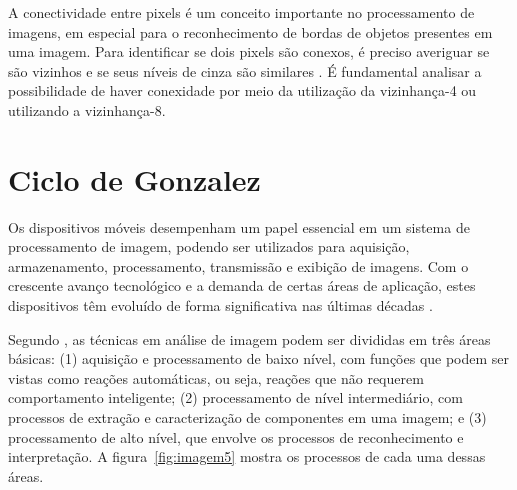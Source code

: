 A conectividade entre pixels é um conceito importante no processamento de imagens, em especial para o reconhecimento de bordas de objetos presentes em uma imagem. Para identificar se dois pixels são conexos, é preciso averiguar se são vizinhos e se seus níveis de cinza são similares . É fundamental analisar a possibilidade de haver conexidade por meio da utilização da vizinhança-4 ou utilizando a vizinhança-8.




\section{Ciclo de Gonzalez}
Os dispositivos móveis desempenham um papel essencial em um sistema de processamento de imagem, podendo ser utilizados para aquisição, armazenamento, processamento, transmissão e exibição de imagens. Com o crescente avanço tecnológico e a demanda de certas áreas de aplicação, estes dispositivos têm evoluído de forma significativa nas últimas décadas \cite{PEDRINI2008}.

Segundo , as técnicas em análise de imagem podem ser divididas em três áreas básicas: (1) aquisição e processamento de baixo nível, com funções que podem ser vistas como reações automáticas, ou seja, reações que não requerem comportamento inteligente; (2) processamento de nível intermediário, com processos de extração e caracterização de componentes em uma imagem; e (3) processamento de alto nível, que envolve os processos de reconhecimento e interpretação. A figura~\ref{fig:imagem5} mostra os processos de cada uma dessas áreas.



